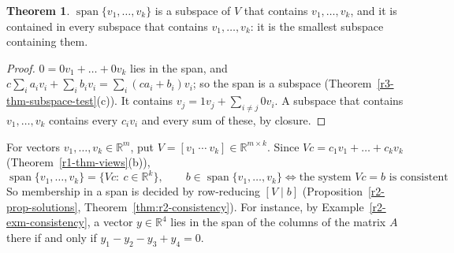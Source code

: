\documentclass[12pt]{article}
\newcommand{\R}{\mathbb R}
\DeclareMathOperator{\Span}{span}
\theoremstyle{definition}
\newtheorem{theorem}{Theorem}
\begin{document}
\begin{theorem}\label{r3-thm-span}
\(\Span\{v_1,\dots,v_k\}\) is a subspace of \(V\) that contains \(v_1,\dots,v_k\), and it is
contained in every subspace that contains \(v_1,\dots,v_k\): it is the smallest subspace
containing them.
\end{theorem}
\begin{proof}
\(0=0v_1+\dots+0v_k\) lies in the span, and
\(c\sum_ia_iv_i+\sum_ib_iv_i=\sum_i(ca_i+b_i)v_i\); so the span is a subspace
(Theorem~\ref{r3-thm-subspace-test}(c)). It contains \(v_j=1v_j+\sum_{i\ne j}0v_i\). A subspace
that contains \(v_1,\dots,v_k\) contains every \(c_iv_i\) and every sum of these, by closure.
\end{proof}

For vectors \(v_1,\dots,v_k\in\R^m\), put \(V=[v_1\ \cdots\ v_k]\in\R^{m\times k}\). Since
\(Vc=c_1v_1+\dots+c_kv_k\) (Theorem~\ref{r1-thm-views}(b)),
\[
\Span\{v_1,\dots,v_k\}=\{Vc:\ c\in\R^k\},\qquad
b\in\Span\{v_1,\dots,v_k\}\iff\text{the system }Vc=b\text{ is consistent}
\]
So membership in a span is decided by row-reducing \([V\mid b]\)
(Proposition~\ref{r2-prop-solutions}, Theorem~\ref{thm:r2-consistency}). For instance, by
Example~\ref{r2-exm-consistency}, a vector \(y\in\R^4\) lies in the span of the columns of the
matrix \(A\) there if and only if \(y_1-y_2-y_3+y_4=0\).
\end{document}
